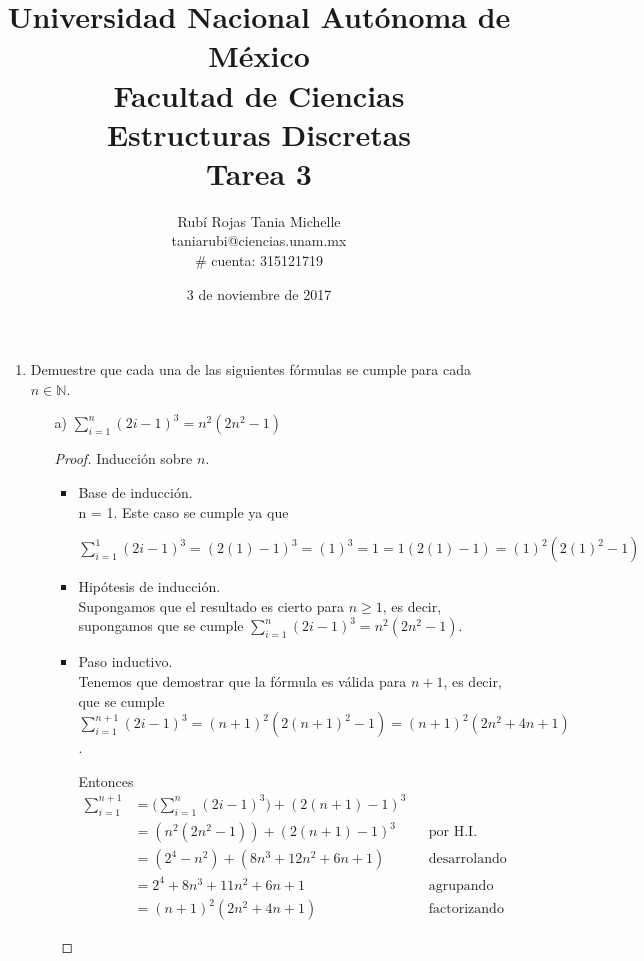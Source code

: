 \documentclass[letterpaper,11pt]{article}
\title{Universidad Nacional Autónoma de México \\
       Facultad de Ciencias \\
       Estructuras Discretas \\ 
       Tarea 3}
\author{Rubí Rojas Tania Michelle \\
        taniarubi@ciencias.unam.mx \\
        \# cuenta: 315121719}
\date{3 de noviembre de 2017}
\begin{document}
\maketitle

\begin{enumerate}
    \item Demuestre que cada una de las siguientes fórmulas se cumple para cada
    $n \in ℕ$.
    \begin{itemize}
        \item[a)] $∑_{i=1}^{n}(2i -1)^{3} = n^{2}(2n^{2}-1)$
        \begin{proof}
            Inducción sobre $n$.
            \begin{itemize}
                \item Base de inducción. \\
                n = 1. Este caso se cumple ya que 

                $∑_{i=1}^{1}(2i - 1)^{3} = (2(1) - 1)^{3} = (1)^{3} = 1 = 
                1 (2(1) - 1) =(1)^{2}(2(1)^{2} - 1)$

                \item Hipótesis de inducción. \\
                Supongamos que el resultado es cierto para $n \geq 1$, es decir, 
                supongamos que se cumple $\sum_{i=1}^{n}(2i-1)^{3} = 
                n^{2}(2n^{2}-1)$.

                \item Paso inductivo. \\ 
                Tenemos que demostrar que la fórmula es válida para $n + 1$, es 
                decir, que se cumple $\sum_{i=1}^{n+1} (2i - 1)^{3} = 
                (n +1)^{2}(2(n + 1)^{2} - 1) = (n+1)^{2}(2n^{2} + 4n + 1)$. 

                Entonces 
                \begin{align*}
                    \sum_{i=1}^{n+1} 
                    &= \bigg (\sum_{i=1}^{n}(2i-1)^{3} \bigg) + (2(n+1) - 1)^{3} \\ 
                    &= (n^{2}(2n^{2} - 1)) + (2(n+1) - 1)^{3} 
                    && \text{por H.I.} \\ 
                    &= (2^{4} - n^{2}) + (8n^{3} + 12n^{2} + 6n + 1)
                    && \text{desarrolando términos} \\
                    &= 2^{4} + 8n^{3} + 11n^{2} + 6n +1
                    && \text{agrupando términos semejantes} \\ 
                    &= (n+1)^{2}(2n^{2} + 4n + 1)
                    && \text{factorizando}
                \end{align*}
            \end{itemize}
        \end{proof}


\end{itemize}
\end{enumerate}
\end{document}
